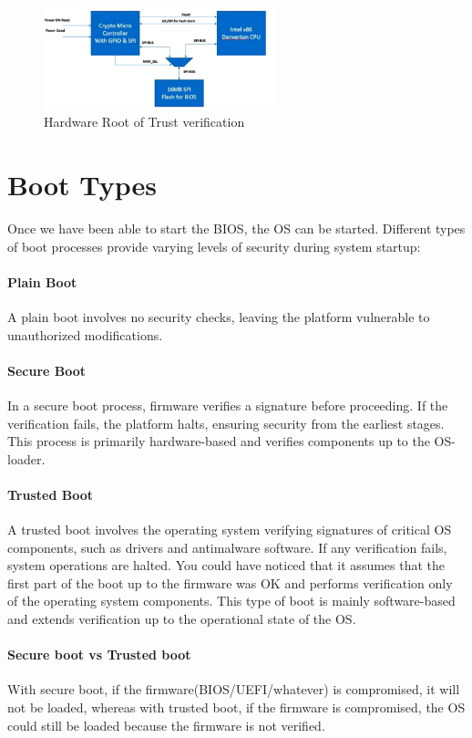 \begin{figure}[H]
  \centering
  \includegraphics[width=0.6\textwidth]{img/Hw RoT verification.png}
  \caption{Hardware Root of Trust verification}
  \label{fig:hw rot}
\end{figure}
\section{Boot Types}
Once we have been able to start the BIOS, the OS can be started.
Different types of boot processes provide varying levels of security
during system startup:

\paragraph{Plain Boot} A plain boot involves no security checks, 
leaving the platform vulnerable to unauthorized modifications.

\paragraph{Secure Boot} In a secure boot process, firmware verifies 
a signature before proceeding. If the verification fails, the platform 
halts, ensuring security from the earliest stages. This process is 
primarily hardware-based and verifies components up to the 
OS-loader.

\paragraph{Trusted Boot} A trusted boot involves the operating system
verifying signatures of critical OS components, such as drivers and
antimalware software. If any verification fails, system operations are
halted. You could have noticed that it assumes that the first part of
the boot up to the firmware was OK and performs verification only of
the operating system components. This type of boot is mainly
software-based and extends verification up to the operational state of
the OS.

\paragraph{Secure boot vs Trusted boot} With secure boot, if the
firmware(BIOS/UEFI/whatever) is compromised, it will not be loaded,
whereas with trusted boot, if the firmware is compromised, the OS
could still be loaded because the firmware is not verified. 


